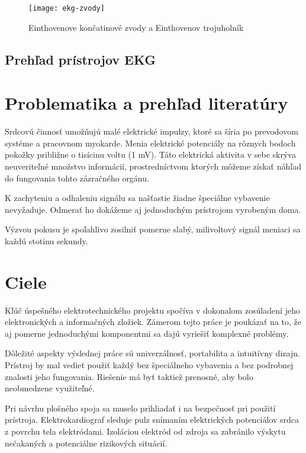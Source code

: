 \documentclass[titlepage]{article}
\begin{document}
\begin{figure}[!ht]
\begin{center}
\texttt{[image: ekg-zvody]}
\caption{Einthovenove končatinové zvody a Einthovenov trojuholník}
\end{center}
\end{figure}


\newpage 
\subsection{Prehľad prístrojov EKG}


\newpage
\section*{Problematika a prehľad literatúry}
Srdcovú činnosť umožňujú malé elektrické impulzy, ktoré sa šíria po prevodovom systéme a pracovnom myokarde. Menia elektrické potenciály na rôznych bodoch pokožky približne o tisícinu voltu (1 mV). Táto elektrická aktivita v sebe skrýva neuveriteľné množstvo informácií, prostredníctvom ktorých môžeme získať náhľad do fungovania tohto zázračného orgánu.

K zachyteniu a odhaleniu signálu sa našťastie žiadne špeciálne vybavenie nevyžaduje. Odmerať ho dokážeme aj jednoduchým prístrojom vyrobeným doma.

Výzvou pokusu je spoľahlivo zosilniť pomerne slabý, milivoltový signál meniaci sa každú stotinu sekundy. 



\newpage
\section*{Ciele}
Kľúč úspešného elektrotechnického projektu spočíva v dokonalom zosúladení jeho elektronických a informačných zložiek. Zámerom tejto práce je poukázať na to, že aj pomerne jednoduchými komponentmi sa dajú vyriešiť komplexné problémy. 

Dôležité aspekty výslednej práce sú univerzálnosť, portabilita a intuitívny dizajn. Prístroj by mal vedieť použiť každý bez špeciálneho vybavenia a bez podrobnej znalosti jeho fungovania. Riešenie má byť taktiež prenosné, aby bolo neobmedzene využiteľné.

Pri návrhu plošného spoja sa muselo prihliadať i na bezpečnosť pri použití prístroja. Elektrokardiograf sleduje pulz snímaním elektrických potenciálov srdca z povrchu tela elektródami. Izoláciou elektród od zdroja sa zabránilo výskytu nečakaných a potenciálne rizikových situácií.
\end{document}
